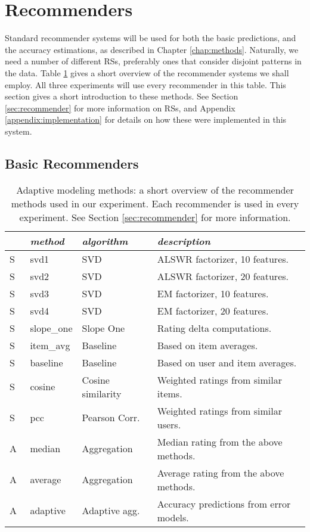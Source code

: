 \section{Recommenders}

Standard recommender systems will be used for both the basic predictions, and the accuracy estimations, as described in Chapter \ref{chap:methods}.
Naturally, we need a number of different RSs, preferably ones that consider
disjoint patterns in the data. Table \ref{table:results:methods}
gives a short overview of the recommender systems we shall employ.
All three experiments will use every recommender in this table.
This section gives a short introduction to these methods.
See Section \ref{sec:recommender} for more information on RSs, 
and Appendix \ref{appendix:implementation} for details on how these were implemented in this system.


\subsection{Basic Recommenders}

\begin{table}[t]
  \begin{tabular*}{\textwidth}{ l l l l }
    \toprule
    ~ & \emph{method} &  \emph{algorithm} & \emph{description} \\
    \midrule
    S & svd1          & SVD                   & ALSWR factorizer, 10 features. \\
    S & svd2          & SVD                   & ALSWR factorizer, 20 features. \\
    S & svd3          & SVD                   & EM factorizer, 10 features. \\
    S & svd4          & SVD                   & EM factorizer, 20 features. \\
    S & slope\_one    & Slope One             & Rating delta computations. \\
    S & item\_avg     & Baseline              & Based on item averages. \\ 
    S & baseline      & Baseline              & Based on user and item averages.\\ 
    S & cosine   	    & Cosine similarity     & Weighted ratings from similar items.\\ 
    S & pcc       	  & Pearson Corr.         & Weighted ratings from similar users.\\
    \midrule
    A & median    	  & Aggregation           & Median rating from the above methods. \\
    A & average    	  & Aggregation           & Average rating from the above methods. \\
    A & adaptive      & Adaptive agg.         & Accuracy predictions from error models. \\
    \bottomrule
  \end{tabular*}
  \caption[Adaptive Modeling Methods]{
    Adaptive modeling methods: a short overview of the recommender methods
    used in our experiment.
    Each recommender is used in every experiment. 
    See Section \ref{sec:recommender} for more information.
  }
  \label{table:results:methods}
\end{table}

